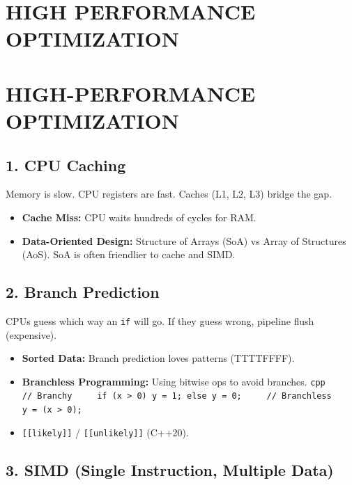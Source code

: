 \hypertarget{high-performance-optimization}{%
\chapter{HIGH PERFORMANCE
OPTIMIZATION}\label{high-performance-optimization}}

\hypertarget{high-performance-optimization-1}{%
\chapter{HIGH-PERFORMANCE
OPTIMIZATION}\label{high-performance-optimization-1}}

\hypertarget{cpu-caching}{%
\section{1. CPU Caching}\label{cpu-caching}}

Memory is slow. CPU registers are fast. Caches (L1, L2, L3) bridge the
gap.

\begin{itemize}
\tightlist
\item
  \textbf{Cache Miss:} CPU waits hundreds of cycles for RAM.
\item
  \textbf{Data-Oriented Design:} Structure of Arrays (SoA) vs Array of
  Structures (AoS). SoA is often friendlier to cache and SIMD.
\end{itemize}

\hypertarget{branch-prediction}{%
\section{2. Branch Prediction}\label{branch-prediction}}

CPUs guess which way an \passthrough{\lstinline!if!} will go. If they
guess wrong, pipeline flush (expensive).

\begin{itemize}
\tightlist
\item
  \textbf{Sorted Data:} Branch prediction loves patterns (TTTTFFFF).
\item
  \textbf{Branchless Programming:} Using bitwise ops to avoid branches.
  \passthrough{\lstinline!cpp     // Branchy     if (x > 0) y = 1; else y = 0;     // Branchless     y = (x > 0);!}
\item
  \passthrough{\lstinline![[likely]]!} /
  \passthrough{\lstinline![[unlikely]]!} (C++20).
\end{itemize}

\hypertarget{simd-single-instruction-multiple-data}{%
\section{3. SIMD (Single Instruction, Multiple
Data)}\label{simd-single-instruction-multiple-data}}

